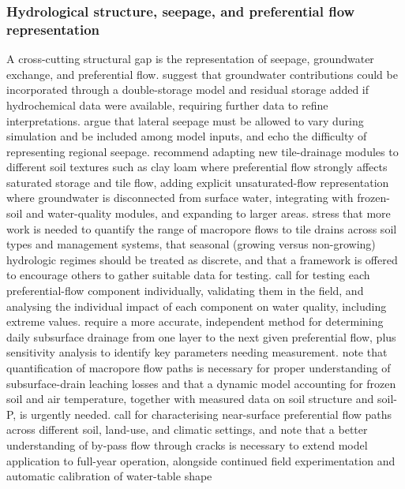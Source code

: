 \documentclass[11pt]{article}
\begin{document}
\subsubsection{Hydrological structure, seepage, and preferential flow representation}

A cross-cutting structural gap is the representation of seepage, groundwater
exchange, and preferential flow. \textcite{DaneshYazdi2016} suggest that
groundwater contributions could be incorporated through a double-storage model and
residual storage added if hydrochemical data were available, requiring further
data to refine interpretations. \textcite{Feng2018} argue that lateral seepage
must be allowed to vary during simulation and be included among model inputs, and
\textcite{Kelleners2000} echo the difficulty of representing regional seepage.
\textcite{Kompanizare2024} recommend adapting new tile-drainage modules to
different soil textures such as clay loam where preferential flow strongly affects
saturated storage and tile flow, adding explicit unsaturated-flow representation
where groundwater is disconnected from surface water, integrating with frozen-soil
and water-quality modules, and expanding to larger areas. \textcite{Reid2012}
stress that more work is needed to quantify the range of macropore flows to tile
drains across soil types and management systems, that seasonal (growing versus
non-growing) hydrologic regimes should be treated as discrete, and that a
framework is offered to encourage others to gather suitable data for testing.
\textcite{Allaire2011} call for testing each preferential-flow component
individually, validating them in the field, and analysing the individual impact of
each component on water quality, including extreme values. \textcite{Ojeda2018}
require a more accurate, independent method for determining daily subsurface
drainage from one layer to the next given preferential flow, plus sensitivity
analysis to identify key parameters needing measurement. \textcite{Ulén2016} note
that quantification of macropore flow paths is necessary for proper understanding
of subsurface-drain leaching losses and that a dynamic model accounting for frozen
soil and air temperature, together with measured data on soil structure and
soil-P, is urgently needed. \textcite{Frey2012} call for characterising near-surface
preferential flow paths across different soil, land-use, and climatic settings, and
\textcite{LESAFFRE1988} note that a better understanding of by-pass flow through
cracks is necessary to extend model application to full-year operation, alongside
continued field experimentation and automatic calibration of water-table shape
\end{document}
